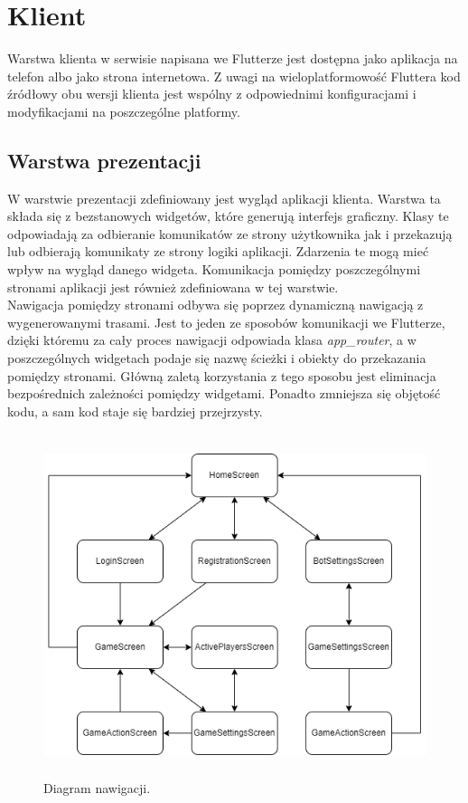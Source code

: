 \section{Klient}

Warstwa klienta w serwisie napisana we Flutterze jest dostępna jako aplikacja na telefon albo jako strona internetowa. Z uwagi na wieloplatformowość Fluttera kod źródłowy obu wersji klienta jest wspólny z odpowiednimi konfiguracjami i modyfikacjami na poszczególne platformy.

\subsection{Warstwa prezentacji}

W warstwie prezentacji zdefiniowany jest wygląd aplikacji klienta. Warstwa ta składa się z bezstanowych widgetów, które generują interfejs graficzny. Klasy te odpowiadają za odbieranie
komunikatów ze strony użytkownika jak i przekazują lub odbierają komunikaty ze strony logiki aplikacji. Zdarzenia te mogą mieć wpływ na wygląd danego widgeta. Komunikacja pomiędzy poszczególnymi stronami aplikacji jest również zdefiniowana w tej warstwie. \\

Nawigacja pomiędzy stronami odbywa się poprzez dynamiczną nawigacją z wygenerowanymi trasami. Jest to jeden ze sposobów komunikacji we Flutterze, dzięki któremu za cały proces nawigacji odpowiada klasa \emph{app\_router}, a w poszczególnych widgetach podaje się nazwę ścieżki i obiekty do przekazania pomiędzy stronami. Główną zaletą korzystania z tego sposobu jest eliminacja bezpośrednich zależności pomiędzy widgetami. Ponadto zmniejsza się objętość kodu, a sam kod staje się bardziej przejrzysty. \\

\begin{figure}[h!]
	\begin{center}
		\includegraphics[width=13cm,height=10cm]{img/nawigacja.png}
	\end{center}
	\caption{{\color{dgray}Diagram nawigacji.}} 
	\label{nawigacja}
\end{figure}  

